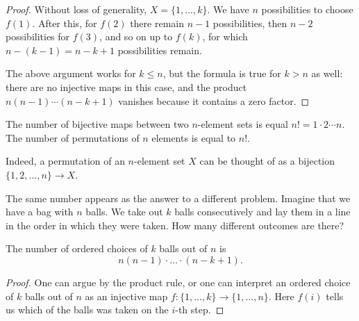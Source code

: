 \begin{page}

\begin{proof}
Without loss of generality, $X = \{1, \ldots, k\}$.
We have $n$ possibilities to choose $f(1)$.
After this, for $f(2)$ there remain $n-1$ possibilities, then $n-2$ possibilities for $f(3)$,
and so on up to $f(k)$, for which $n-(k-1) = n-k+1$ possibilities remain.

The above argument works for $k \le n$, but the formula is true for $k > n$ as well:
there are no injective maps in this case, and the product $n(n-1) \cdots (n-k+1)$ vanishes because it contains a zero factor.
\end{proof}


\end{page}

\begin{page}

\begin{cor}
\label{cor:NumberOfBijections}
The number of bijective maps between two $n$-element sets is equal $n! = 1 \cdot 2 \cdots n$.
The number of permutations of $n$ elements is equal to $n!$.
\end{cor}

\end{page}

\begin{page}

Indeed, a permutation of an $n$-element set $X$ can be thought of as a bijection $\{1, 2, \ldots, n\} \to X$.

The same number appears as the answer to a different problem.
Imagine that we have a bag with $n$ balls.
We take out $k$ balls consecutively and lay them in a line in the order in which they were taken.
How many different outcomes are there?


\end{page}

\begin{page}

\begin{thm}
The number of ordered choices of $k$ balls out of $n$ is
\[
n(n-1)\cdot \ldots \cdot (n-k+1).
\]
\end{thm}

\end{page}

\begin{page}

\begin{proof}
One can argue by the product rule, or one can interpret an ordered choice of $k$ balls out of $n$ as an injective map $f \colon \{1, \ldots, k\} \to \{1, \ldots, n\}$.
Here $f(i)$ tells us which of the balls was taken on the $i$-th step.
\end{proof}




\end{page}

